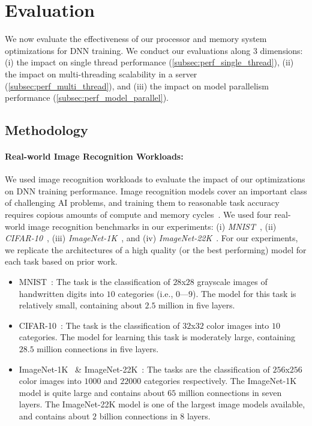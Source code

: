 \section{Evaluation}
\label{sec:eval}
We now evaluate the effectiveness of our processor and memory system optimizations for DNN training.  We conduct our evaluations along $3$ dimensions: (i) the impact on single thread performance (\ref{subsec:perf_single_thread}), (ii) the impact on multi-threading scalability in a server (\ref{subsec:perf_multi_thread}), and (iii)  the impact on model parallelism performance (\ref{subsec:perf_model_parallel}).  

 \subsection{Methodology}
 \label{subsec:eval_method}
 
 \paragraph{Real-world Image Recognition Workloads:} We used image recognition workloads to evaluate the impact of our optimizations on DNN training performance.  Image recognition models cover an important class of challenging AI problems, and training them to reasonable task accuracy requires copious amounts of compute and memory cycles~\cite{Krizhevsky12, Le12, Dean12, Chilimbi14}.  We used four real-world image recognition benchmarks in our experiments: (i) {\it MNIST}~\cite{Lecun98}, (ii) {\it CIFAR-10}~\cite{KrizhevskyThesis}, (iii) {\it ImageNet-1K}~\cite{imagenet09}, and (iv) {\it ImageNet-22K}~\cite{imagenet09}.  For our experiments, we replicate the architectures of a high quality (or the best performing) model for each task based on  prior work.  

\begin{itemize}
\item MNIST~\cite{Chilimbi14}: The task is the classification of $28$x$28$ grayscale images of handwritten digits into $10$ categories (i.e., $0$---$9$).  The model for this task is relatively small, containing about $2.5$ million in five layers.  

\item CIFAR-10~\cite{Srivastava14a}: The task is the classification of $32$x$32$ color images into $10$ categories. The model for learning this task is moderately large, containing $28.5$ million connections in five layers.

\item ImageNet-1K~\cite{Krizhevsky12} \& ImageNet-22K~\cite{Chilimbi14}: The tasks are the classification of $256$x$256$ color images into $1000$ and $22000$ categories respectively. The ImageNet-1K model is quite large and contains about $65$ million connections in seven layers.  The ImageNet-22K model is one of the largest image models available, and contains about $2$ billion connections in $8$ layers. 

\end{itemize} 

